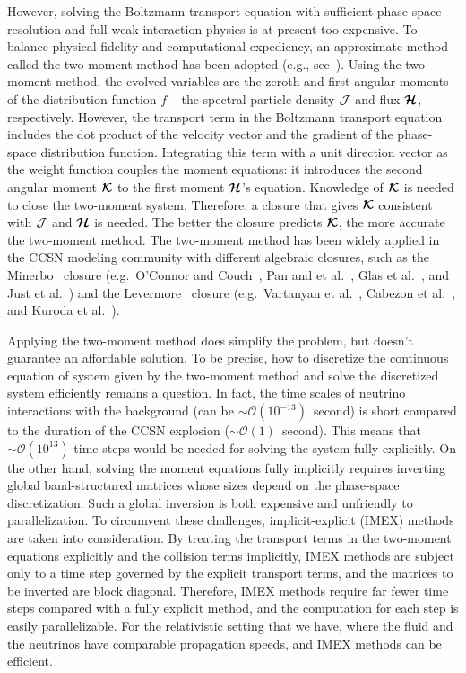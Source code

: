However, solving the Boltzmann transport equation with sufficient phase-space resolution and full weak interaction physics is at present too expensive.
To balance physical fidelity and computational expediency, an approximate method called the two-moment method has been adopted (e.g., see~\cite{kuroda_etal_2016,roberts_etal_2016,just_etal_2018,vartanyan_etal_2018}).
Using the two-moment method, the evolved variables are the zeroth and first angular moments of the distribution function $f$ -- the spectral particle density $\mathcal{J}$ and flux $\boldsymbol{\mathcal{H}}$, respectively.
However, the transport term in the Boltzmann transport equation includes the dot product of the velocity vector and the gradient of the phase-space distribution function.
Integrating this term with a unit direction vector as the weight function couples the moment equations: it introduces the second angular moment $\boldsymbol{\mathcal{K}}$ to the first moment $\boldsymbol{\mathcal{H}}$'s equation.
Knowledge of $\boldsymbol{\mathcal{K}}$ is needed to close the two-moment system.
Therefore, a closure that gives $\boldsymbol{\mathcal{K}}$ consistent with $\mathcal{J}$ and $\boldsymbol{\mathcal{H}}$ is needed.
The better the closure predicts $\boldsymbol{\mathcal{K}}$, the more accurate the two-moment method. 
The two-moment method has been widely applied in the CCSN modeling community with different algebraic closures, such as the Minerbo~\cite{minerbo_1978} closure (e.g.~{O'Connor} and {Couch}~\cite{oConnorCouch_2018}, Pan and et al.~\cite{pan_etal_2018}, Glas et al.~\cite{glas_etal_2018}, and Just et al.~\cite{just_etal_2018}) and the Levermore~\cite{levermore_1984} closure (e.g.~Vartanyan et al.~\cite{vartanyan_etal_2018}, Cabezon et al.~\cite{cabezon_etal_2018}, and Kuroda et al.~\cite{kuroda_etal_2016}). 

Applying the two-moment method does simplify the problem, but doesn't guarantee an affordable solution.
To be precise, how to discretize the continuous equation of system given by the two-moment method and solve the discretized system efficiently remains a question.
In fact, the time scales of neutrino interactions with the background (can be $\sim\mathcal{O}(10^{-13})$~second) is short compared to the duration of the CCSN explosion ($\sim\mathcal{O}(1)$~second).  
This means that $\sim\mathcal{O}(10^{13})$ time steps would be needed for solving the system fully explicitly. 
On the other hand, solving the moment equations fully implicitly requires inverting global band-structured matrices whose sizes depend on the phase-space discretization.
Such a global inversion is both expensive and unfriendly to parallelization.
To circumvent these challenges, implicit-explicit (IMEX) methods are taken into consideration.
By treating the transport terms in the two-moment equations explicitly and the collision terms implicitly, IMEX methods are subject only to a time step governed by the explicit transport terms, and the matrices to be inverted are block diagonal.
Therefore, IMEX methods require far fewer time steps compared with a fully explicit method, and the computation for each step is easily parallelizable.
For the relativistic setting that we have, where the fluid and the neutrinos have comparable propagation speeds, and IMEX methods can be efficient.

